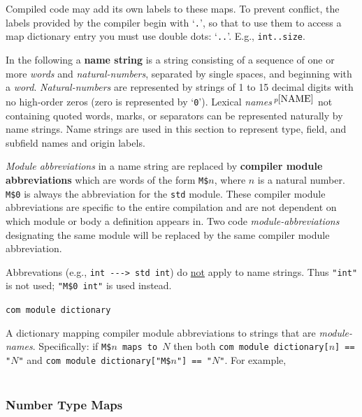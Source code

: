 \documentclass[12pt]{article}
\newcommand{\key}[1]{{\rm \bfseries #1}}
\newcommand{\pagnote}[1]{$\,^{p\pageref{#1}}$}
\newenvironment{indpar}[1][0.3in]%
	{\begin{list}{}%
		     {\setlength{\itemsep}{0in}%
		      \setlength{\topsep}{0in}%
		      \setlength{\parsep}{1ex}%
		      \setlength{\labelwidth}{#1}%
		      \setlength{\leftmargin}{#1}%
		      \addtolength{\leftmargin}{\labelsep}}%
	 \item}%
	{\end{list}}
\begin{document}
Compiled code may add its own labels to these maps.
To prevent conflict, the labels provided by the compiler
begin with `{\tt .}', so
that to use them to access a map dictionary entry
you must use double dots: `{\tt ..}'.
E.g., {\tt int..size}.

In the following a \key{name string} is a string
consisting of a sequence of one or more {\em words}
and {\em natural-numbers}, separated
by single spaces, and beginning with a {\em word}.
{\em Natural-numbers} are represented
by strings of 1 to 15 decimal digits with no high-order
zeros (zero is represented by `{\tt 0}').
Lexical {\em names}\pagnote{NAME} not containing quoted words, marks, or
separators can be represented naturally by name strings.
Name strings are used in this section to represent type, field, and subfield
names and origin labels.

{\em Module abbreviations} in a name string are
replaced by \key{compiler module abbreviations}
which are words of the form {\tt M\$$n$}, where
$n$ is a natural number.  {\tt M\$0} is always
the abbreviation for the {\tt std} module.
These compiler module abbreviations are specific to the
entire compilation and are not dependent on which
module or body a definition appears in.
Two code {\em module-abbreviations} designating the same
module will be replaced by the same compiler module abbreviation.

Abbrevations (e.g., {\tt int -{}-{}-{}> std int})
do \underline{not} apply to name strings.  Thus {\tt "int"} is
not used; {\tt "M\$0 int"} is used instead.

{\tt com module dictionary}
\begin{indpar}
A dictionary mapping compiler module abbreviations
to strings that are {\em mod\-ule-names}.  Specifically:
if {\tt M\$$n$ \rm{maps to} $N$} then both
{\tt com module dictionary[$n$] == "$N$"}
and {\tt com module dictionary["M\$$n$"] == "$N$"}.
For example,
\\[0.5ex]
\hspace*{1.0in}{\tt com module dictionary[0] == "standard"} \\
\hspace*{1.0in}{\tt com module dictionary["M\$0"] == "standard"}

\end{indpar}

\subsubsection{Number Type Maps}
\label{NUMBER-TYPE-MAPS}
\end{document}
